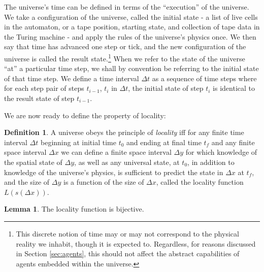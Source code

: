 \documentclass[12pt]{article}
\theoremstyle{definition}
\newtheorem{defn}{Definition}
\newtheorem{lem}{Lemma}
\begin{document}

The universe's time can be defined in terms of the ``execution'' of the
universe. We take a configuration of the universe, called the initial state - a
list of live cells in the automaton, or a tape position, starting state, and
collection of tape data in the Turing machine - and apply the rules of the
universe's physics once. We then say that time has advanced one step or tick,
and the new configuration of the universe is called the result
state.\footnote{This discrete notion of time may or may not correspond to the
physical reality we inhabit, though it is expected to. Regardless, for reasons
discussed in Section \ref{sec:agents}, this should not affect the abstract
capabilities of agents embedded within the universe.} When we refer to the state
of the universe ``at'' a particular time step, we shall by convention be
referring to the initial state of that time step. We define a time interval
\(\Delta t\) as a sequence of time steps where for each step pair of steps
\(t_{i-1}\), \(t_i\) in \(\Delta t\), the initial state of step \(t_i\) is
identical to the result state of step \(t_{i-1}\).



We are now ready to define the property of locality:

\begin{defn}

   A universe obeys the principle of \textit{locality} iff for any finite time
   interval \(\Delta t\) beginning at initial time \(t_0\) and ending at final
   time \(t_f\) and any finite space interval \(\Delta x\) we can define a
   finite space interval \(\Delta y\) for which knowledge of the spatial state
   of \(\Delta y\), as well as any universal state, at \(t_0\), in addition to
   knowledge of the universe's physics, is sufficient to predict the state in
   \(\Delta x\) at \(t_f\), and the size of \(\Delta y\) is a function of the
   size of \(\Delta x\), called the locality function \(L(s(\Delta x))\).

\end{defn}

\begin{lem}
   The locality function is bijective.
\end{lem}
\end{document}
